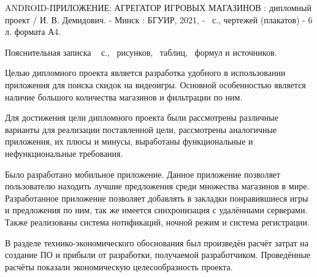 \thispagestyle{empty}

ANDROID-ПРИЛОЖЕНИЕ: АГРЕГАТОР ИГРОВЫХ МАГАЗИНОВ : дипломный проект / И. В. Демидович. - Минск : БГУИР, 2021, -~\pageref*{LastPage} с., чертежей (плакатов) - 6 л. формата А4.

Пояснительная записка ~\pageref*{LastPage} с., \totfig{}~рисунков, \tottab{}~таблиц, \toteq{}~формул и \totref{} источников.

Целью дипломного проекта является разработка удобного в использовании приложения для поиска скидок на видеоигры.
Основной особенностью является наличие большого количества магазинов и фильтрации по ним.

Для достижения цели дипломного проекта были рассмотрены различные варианты для реализации поставленной цели, рассмотрены аналогичные приложения, их плюсы и минусы, выработаны функциональные и нефункциональные требования.

Было разработано мобильное приложение. 
Данное приложение позволяет пользователю находить лучшие предложения среди множества магазинов в мире.
Разработанное приложение позволяет добавлять в закладки понравившиеся игры и предложения по ним, так же имеется синхронизация с удалёнными серверами.
Также реализованы система нотификаций, ночной режим и система регистрации.

В разделе технико-экономического обоснования был произведён расчёт затрат на создание ПО и прибыли от разработки, получаемой разработчиком. Проведённые расчёты показали экономическую целесообразность проекта.
\clearpage
